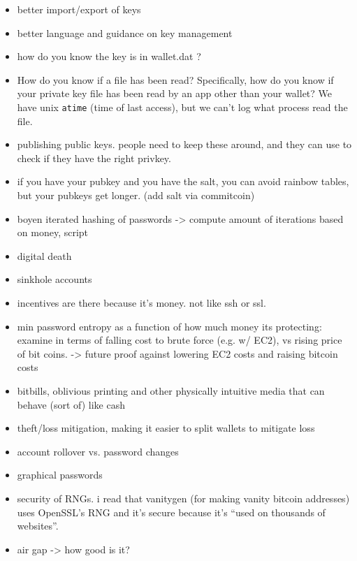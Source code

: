 \begin{itemize}
  \item better import/export of keys
  \item better language and guidance on key management 
  \item how do you know the key is in wallet.dat ?  
  \item How do you know if a file has been read? Specifically, how do you know if your private key file has been read by an app other than your wallet? We have unix \texttt{atime} (time of last access), but we can't log what process read the file. 
  \item publishing public keys. people need to keep these around, and they can use to check if they have the right privkey. 
  \item if you have your pubkey and you have the salt, you can avoid rainbow tables, but your pubkeys get longer. (add salt via commitcoin) 
  \item boyen iterated hashing of passwords -> compute amount of iterations based on money, script
  \item digital death
  \item sinkhole accounts
  \item incentives are there because it's money. not like ssh or ssl. 
  \item min password entropy as a function of how much money its protecting: examine in terms of falling cost to brute force (e.g. w/ EC2), vs rising price of bit coins. -> future proof against lowering EC2 costs and raising bitcoin costs
  \item bitbills, oblivious printing and other physically intuitive media that can behave (sort of) like cash
  \item theft/loss mitigation, making it easier to split wallets to mitigate loss
  \item account rollover vs. password changes
  \item graphical passwords
  \item security of RNGs. i read that vanitygen (for making vanity bitcoin addresses) uses OpenSSL's RNG and it's secure because it's ``used on thousands of websites''. 
  \item air gap -> how good is it?
\end{itemize}

